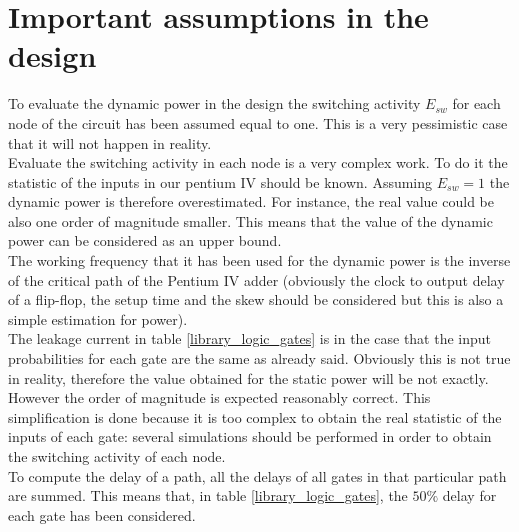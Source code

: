 \section{Important assumptions in the design}\label{ciao}
To evaluate the dynamic power in the design the switching activity $E_{sw}$ for each node of the circuit has been assumed equal to one. This is a very pessimistic case that it will not happen in reality.\\
Evaluate the switching activity in each node is a very complex work. To do it the statistic of the inputs in our pentium IV should be known. Assuming $E_{sw}=1$ the dynamic power is therefore overestimated. For instance, the real value could be also one order of magnitude smaller. This means that the value of the dynamic power can be considered as an upper bound.\\
The working frequency that it has been used for the dynamic power is the inverse of the critical path of the Pentium IV adder (obviously the clock to output delay of a flip-flop, the setup time and the skew should be considered but this is also a simple estimation for power).\\
The leakage current in table \ref{library_logic_gates} is in the case that the input probabilities for each gate are the same as already said. Obviously this is not true in reality, therefore the value obtained for the static power will be not exactly. However the order of magnitude is expected reasonably correct. This simplification is done because it is too complex to obtain the real statistic of the inputs of each gate: several simulations should be performed in order to obtain the switching activity of each node.\\
To compute the delay of a path, all the delays of all gates in that particular path are summed. This means that, in table \ref{library_logic_gates}, the $50\%$ delay for each gate has been considered.





